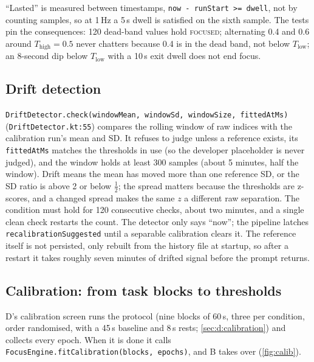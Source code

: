 \documentclass[10pt,a4paper]{article}
\newcommand{\file}[1]{\texttt{\small #1}}          %
\newcommand{\code}[1]{\texttt{#1}}                  %
\newcommand{\state}[1]{\textsc{\small #1}}          %
\newcommand{\Thigh}{T_{\mathrm{high}}}
\newcommand{\Tlow}{T_{\mathrm{low}}}
\begin{document}
``Lasted'' is measured between timestamps, \code{now - runStart >= dwell}, not by counting
samples, so at 1\,Hz a 5\,s dwell is satisfied on the sixth sample. The tests pin the consequences:
120 dead-band values hold \state{focused}; alternating 0.4 and 0.6 around $\Thigh = 0.5$ never
chatters because 0.4 is in the dead band, not below $\Tlow$; an 8-second dip below $\Tlow$ with a
10\,s exit dwell does not end focus.

\subsection{Drift detection}

\code{DriftDetector.check(windowMean, windowSd, windowSize, fittedAtMs)}
(\file{DriftDetector.kt:55}) compares the rolling window of raw indices with the calibration
run's mean and SD. It refuses to judge unless a reference exists, its \code{fittedAtMs} matches the
thresholds in use (so the developer placeholder is never judged), and the window holds at least
300 samples (about 5 minutes, half the window). Drift means the mean has moved more than one
reference SD, or the SD ratio is above 2 or below $\tfrac12$; the spread matters because the
thresholds are z-scores, and a changed spread makes the same $z$ a different raw separation. The
condition must hold for 120 consecutive checks, about two minutes, and a single clean check restarts
the count. The detector only says ``now''; the pipeline latches
\code{recalibrationSuggested} until a separable calibration clears it. The reference itself is not
persisted, only rebuilt from the history file at startup, so after a restart it takes roughly
seven minutes of drifted signal before the prompt returns.

\subsection{Calibration: from task blocks to thresholds}

D's calibration screen runs the protocol (nine blocks of 60\,s, three per condition, order
randomised, with a 45\,s baseline and 8\,s rests; \cref{sec:d:calibration}) and collects every
epoch. When it is done it calls \code{FocusEngine.fitCalibration(blocks, epochs)}, and B takes
over (\cref{fig:calib}).
\end{document}
